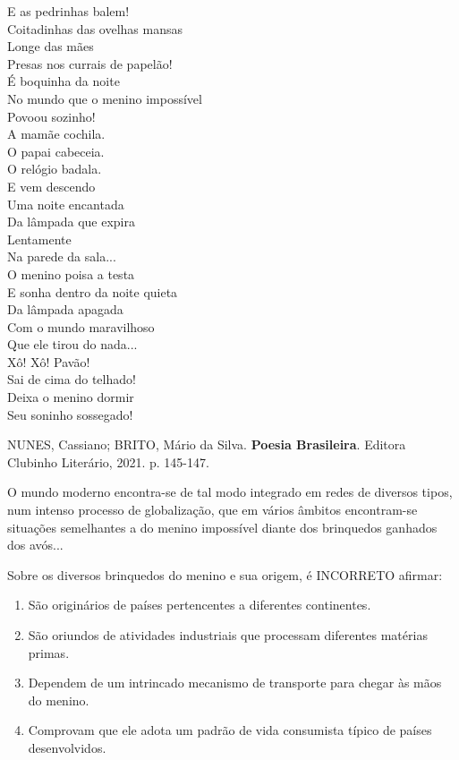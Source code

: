 \begin{minipage}[t]{0.32\linewidth}
E as pedrinhas balem!\\
Coitadinhas das ovelhas mansas\\
Longe das mães\\
Presas nos currais de papelão!\\[0.6em]
É boquinha da noite\\
No mundo que o menino impossível\\
Povoou sozinho!\\[0.6em]
A mamãe cochila.\\
O papai cabeceia.\\
O relógio badala.\\[0.6em]
E vem descendo\\
Uma noite encantada\\
Da lâmpada que expira\\
Lentamente\\
Na parede da sala...\\[0.6em]
O menino poisa a testa\\
E sonha dentro da noite quieta\\
Da lâmpada apagada\\
Com o mundo maravilhoso\\
Que ele tirou do nada...\\[0.6em]
Xô! Xô! Pavão!\\
Sai de cima do telhado!\\
Deixa o menino dormir\\
Seu soninho sossegado!
\end{minipage}

\par\medskip NUNES, Cassiano; BRITO, Mário da Silva. \textbf{Poesia Brasileira}. Editora Clubinho Literário, 2021. p. 145-147.

O mundo moderno encontra-se de tal modo integrado em redes de diversos tipos, num intenso processo de globalização, que em vários âmbitos encontram-se situações semelhantes a do menino impossível diante dos brinquedos ganhados dos avós...

Sobre os diversos brinquedos do menino e sua origem, é INCORRETO afirmar:
\begin{enumerate}
\item São originários de países pertencentes a diferentes continentes.
\item São oriundos de atividades industriais que processam diferentes matérias primas.
\item Dependem de um intrincado mecanismo de transporte para chegar às mãos do menino.
\item Comprovam que ele adota um padrão de vida consumista típico de países desenvolvidos.
\end{enumerate}
